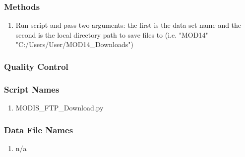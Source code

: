 \subsubsection*{Methods}
\begin{enumerate}
\item Run script and pass two arguments: the first is the data set name and the second is the local directory path to save files to (i.e. "MOD14" "C:/Users/User/MOD14\_Downloads")
\end{enumerate}
\subsubsection*{Quality Control}
\subsubsection*{Script Names}
\begin{enumerate}
\item MODIS\_FTP\_Download.py
\end{enumerate}
\subsubsection*{Data File Names}
\begin{enumerate}
\item n/a
\end{enumerate}